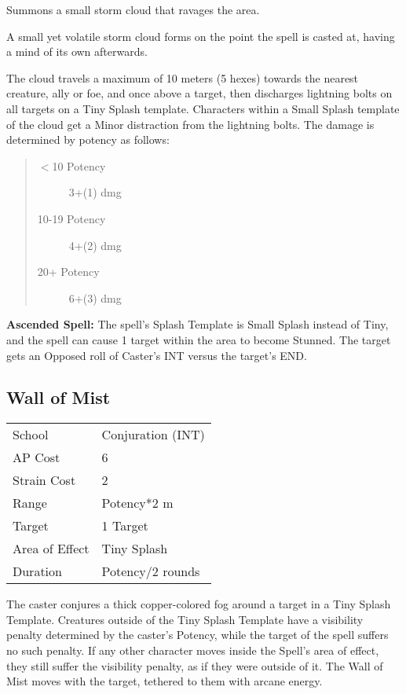 \documentclass[11pt,a4paper,twocolumn]{book}
\begin{document}
\medskip

Summons a small storm cloud that ravages the area.

A small yet volatile storm cloud forms on the point the spell is casted at, having a mind of its own afterwards.

The cloud travels a maximum of 10 meters (5 hexes) towards the nearest creature, ally or foe, and once above a target, then discharges lightning bolts on all targets on a Tiny Splash template. Characters within a Small Splash template of the cloud get a Minor distraction from the lightning bolts. The damage is determined by potency as follows:

\begin{quote}
	\begin{description}
		\item[$<$10 Potency] 	3+(1) dmg
		\item[10-19 Potency] 	4+(2) dmg
		\item[20+ Potency] 		6+(3) dmg
	\end{description}	
\end{quote}

\textbf{Ascended Spell:} The spell's Splash Template is Small Splash instead of Tiny, and the spell can cause 1 target within the area to become Stunned. The target gets an Opposed roll of Caster's INT versus the target's END.

\vfill

\subsection*{Wall of Mist}
{
	\begin{tabu} to 75mm{| X[l,4] | X[l,7] |}
		\hline
		School 			& Conjuration (INT) 			\\
		AP Cost	      	& 6 							\\
		Strain Cost     & 2 							\\
		Range     		& Potency*2 m					\\
		Target      	& 1 Target						\\
		Area of Effect  & Tiny Splash 	 			    \\
		Duration     	& Potency/2 rounds				\\ \hline
	\end{tabu}
	
}

\medskip

The caster conjures a thick copper-colored fog around a target in a Tiny Splash Template. Creatures outside of the Tiny Splash Template have a visibility penalty determined by the caster's Potency, while the target of the spell suffers no such penalty. If any other character moves inside the Spell's area of effect, they still suffer the visibility penalty, as if they were outside of it. The Wall of Mist moves with the target, tethered to them with arcane energy.
\end{document}
